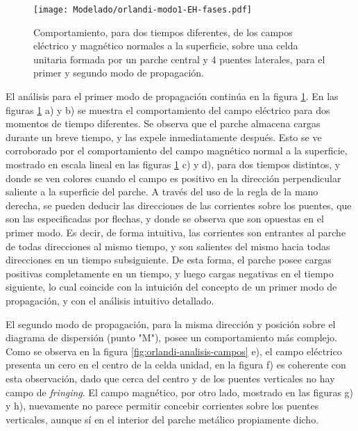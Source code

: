 \begin{figure}[h]
	\centering
	\texttt{[image: Modelado/orlandi-modo1-EH-fases.pdf]}
	\caption{Comportamiento, para dos tiempos diferentes, de los campos eléctrico y magnético normales a la superficie, sobre una celda unitaria formada por un parche central y 4 puentes laterales, para el primer y segundo modo de propagación.}
	\label{fig:orlandi-analisis-campos-fases}
\end{figure}

El análisis para el primer modo de propagación continúa en la figura \ref{fig:orlandi-analisis-campos-fases}. En las figuras \ref{fig:orlandi-analisis-campos-fases} a) y b) se muestra el comportamiento del campo eléctrico para dos momentos de tiempo diferentes. Se observa que el parche almacena cargas durante un breve tiempo, y las expele inmediatamente después. Esto se ve corroborado por el comportamiento del campo magnético normal a la superficie, mostrado en escala lineal en las figuras \ref{fig:orlandi-analisis-campos-fases} c) y d), para dos tiempos distintos, y donde se ven colores cuando el campo es positivo en la dirección perpendicular saliente a la superficie del parche. A través del uso de la regla de la mano derecha, se pueden deducir las direcciones de las corrientes sobre los puentes, que son las especificadas por flechas, y donde se observa que son opuestas en el primer modo. Es decir, de forma intuitiva, las corrientes son entrantes al parche de todas direcciones al mismo tiempo, y son salientes del mismo hacia todas direcciones en un tiempo subsiguiente. De esta forma, el parche posee cargas positivas completamente en un tiempo, y luego cargas negativas en el tiempo siguiente, lo cual coincide con la intuición del concepto de un primer modo de propagación, y con el análisis intuitivo detallado.

El segundo modo de propagación, para la misma dirección y posición sobre el diagrama de dispersión (punto "M"), posee un comportamiento más complejo. Como se observa en la figura \ref{fig:orlandi-analisis-campos} e), el campo eléctrico presenta un cero en el centro de la celda unidad, en la figura f) es coherente con esta observación, dado que cerca del centro y de los puentes verticales no hay campo de \textit{fringing}. El campo magnético, por otro lado, mostrado en las figuras g) y h), nuevamente no parece permitir concebir corrientes sobre los puentes verticales, aunque sí en el interior del parche metálico propiamente dicho.

